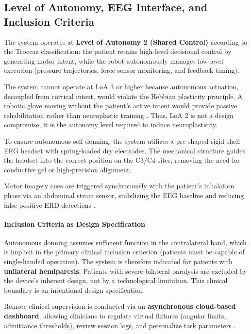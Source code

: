 \documentclass[11pt,a4paper]{article}
\begin{document}
\subsection{Level of Autonomy, EEG Interface, and Inclusion Criteria}

The system operates at \textbf{Level of Autonomy 2 (Shared Control)} according to the Troccaz classification: 
the patient retains high-level decisional control by generating motor intent, while the robot autonomously manages low-level execution 
(pressure trajectories, force sensor monitoring, and feedback timing).

The system cannot operate at LoA 3 or higher because autonomous actuation, decoupled from cortical intent, 
would violate the Hebbian plasticity principle. A robotic glove moving without the patient's active intent would provide 
passive rehabilitation rather than neuroplastic training \cite{biasiucci2018brain, krueger2024hebbian}.
 Thus, LoA 2 is not a design compromise; it is the autonomy level required to induce neuroplasticity.

To ensure autonomous self-donning, the system utilizes a pre-shaped rigid-shell EEG headset with spring-loaded 
dry electrodes. The mechanical structure guides the headset into the correct position on the C3/C4 
sites, removing the need for conductive gel or high-precision alignment.

Motor imagery cues are triggered synchronously with the patient's inhalation phase via an abdominal strain sensor, 
stabilizing the EEG baseline and reducing false-positive ERD detections \cite{premchand2025personalized}.

\paragraph{Inclusion Criteria as Design Specification}

Autonomous donning assumes sufficient function in the contralateral hand, 
which is implicit in the primary clinical inclusion criterion (patients must be capable of single-handed operation). 
The system is therefore indicated for patients with \textbf{unilateral hemiparesis}. Patients with severe bilateral paralysis are
excluded by the device's inherent design, not by a technological limitation. This clinical boundary is an intentional design specification.

Remote clinical supervision is conducted via an \textbf{asynchronous cloud-based dashboard},
allowing clinicians to regulate virtual fixtures (angular limits, admittance thresholds), review session logs, 
and personalize task parameters \cite{proietti2024combining}.
\end{document}
